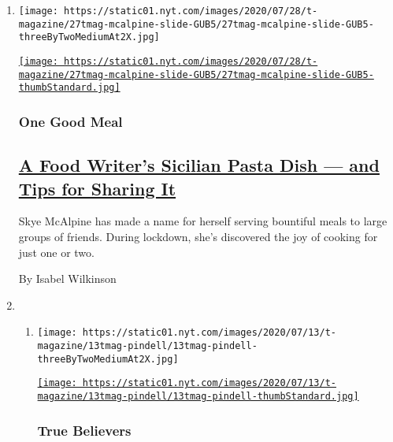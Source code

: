 \begin{enumerate}
\def\labelenumi{\arabic{enumi}.}
\item
  \texttt{[image: https://static01.nyt.com/images/2020/07/28/t-magazine/27tmag-mcalpine-slide-GUB5/27tmag-mcalpine-slide-GUB5-threeByTwoMediumAt2X.jpg]}

  \href{/2020/07/29/t-magazine/skye-mcalpine-pasta-cooking.html}{\texttt{[image: https://static01.nyt.com/images/2020/07/28/t-magazine/27tmag-mcalpine-slide-GUB5/27tmag-mcalpine-slide-GUB5-thumbStandard.jpg]}}

  \hypertarget{one-good-meal}{%
  \subsubsection{One Good Meal}\label{one-good-meal}}

  \hypertarget{a-food-writers-sicilian-pasta-dish--and-tips-for-sharing-it}{%
  \subsection{\texorpdfstring{\href{/2020/07/29/t-magazine/skye-mcalpine-pasta-cooking.html}{A
  Food Writer's Sicilian Pasta Dish --- and Tips for Sharing
  It}}{A Food Writer's Sicilian Pasta Dish --- and Tips for Sharing It}}\label{a-food-writers-sicilian-pasta-dish--and-tips-for-sharing-it}}

  Skye McAlpine has made a name for herself serving bountiful meals to
  large groups of friends. During lockdown, she's discovered the joy of
  cooking for just one or two.

  By Isabel Wilkinson
\item
  \begin{enumerate}
  \def\labelenumii{\arabic{enumii}.}
  \item
    \texttt{[image: https://static01.nyt.com/images/2020/07/13/t-magazine/13tmag-pindell/13tmag-pindell-threeByTwoMediumAt2X.jpg]}

    \href{/2020/07/24/t-magazine/howardena-pindell.html}{\texttt{[image: https://static01.nyt.com/images/2020/07/13/t-magazine/13tmag-pindell/13tmag-pindell-thumbStandard.jpg]}}

    \hypertarget{true-believers}{%
    \subsubsection{True Believers}\label{true-believers}}

    \hypertarget{a-portrait-of-an-artist-not-to-be-underestimated}{%
}
\end{enumerate}
\end{enumerate}
